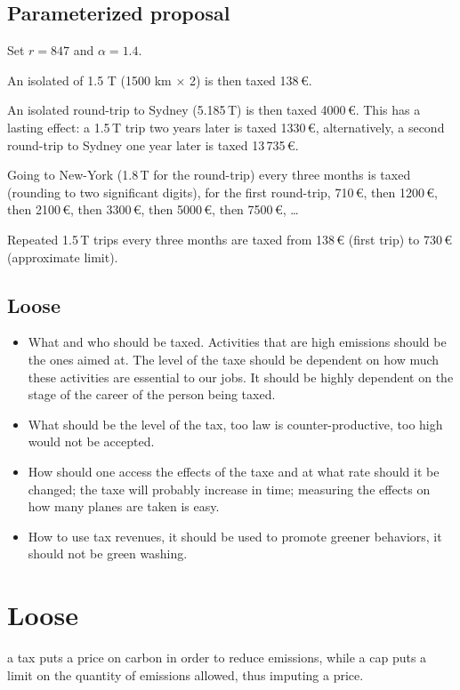 \documentclass[version=3.21, pagesize, twoside=off, bibliography=totoc, DIV=calc, fontsize=12pt, a4paper, french, english]{scrartcl}
\begin{document}
\subsection{Parameterized proposal}
Set $r = 847$ and $α = 1.4$.

An isolated of 1.5 T (1500 km × 2)  is then taxed 138\,€.

An isolated round-trip to Sydney (5.185\,T) is then taxed 4000\,€. This has a lasting effect: a 1.5\,T trip two years later is taxed 1330\,€, alternatively, a second round-trip to Sydney one year later is taxed 13\,735\,€.

Going to New-York (1.8\,T for the round-trip) every three months is taxed (rounding to two significant digits), for the first round-trip, 710\,€, then 1200\,€, then 2100\,€, then 3300\,€, then 5000\,€, then 7500\,€, …

Repeated 1.5\,T trips every three months are taxed from 138\,€ (first trip) to 730\,€ (approximate limit).

\subsection{Loose}
\begin{itemize}
\item What and who should be taxed. Activities that are high emissions should be the ones aimed at. The level of the taxe should be dependent on how much these activities are essential to our jobs. It should be highly dependent on the stage of the career of the person being taxed.
\item What should be the level of the tax, too law is counter-productive, too high would not be accepted.  
\item How should one access the effects of the taxe and at what rate should it be changed; the taxe will probably increase in time; measuring the effects on how many planes are taken is easy.  
\item How to use tax revenues, it should be used to promote greener behaviors, it should not be green washing. 
\end{itemize}

%

\appendix
\section{Loose}
a tax puts a price on carbon in order to reduce emissions, while a cap puts a limit on the quantity of emissions allowed, thus imputing a price.
\end{document}
